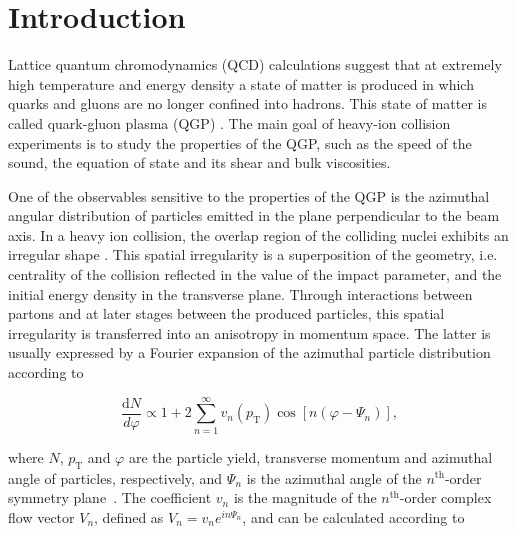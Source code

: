 \section{Introduction}
\label{Sec:Introduction}

Lattice quantum chromodynamics (QCD) calculations \cite{Borsanyi:2010cj,Bhattacharya:2014ara} suggest that at extremely high temperature and energy density a state of matter is produced in which quarks and gluons are no longer confined into hadrons. This state of matter is called quark-gluon plasma (QGP) \cite{Shuryak:1984nq, Cleymans:1985wb, Bass:1998vz}. The main goal of heavy-ion collision experiments is to study the properties of the QGP, such as the speed of the sound, the equation of state and its shear and bulk viscosities.

One of the observables sensitive to the properties of the QGP is the azimuthal angular distribution of particles emitted in the plane perpendicular to the beam axis. In a heavy ion collision, the overlap region of the colliding nuclei exhibits an irregular shape \cite{Bhalerao:2006tp, Alver:2008zza, Alver:2010gr, Alver:2010dn, Manly:2005zy}. This spatial irregularity is a superposition of the geometry, i.e. centrality of the collision reflected in the value of the impact parameter, and the initial energy density in the transverse plane. Through interactions between partons and at later stages between the produced particles, this spatial irregularity is transferred into an anisotropy in momentum space. The latter is usually expressed by a Fourier expansion of the azimuthal particle distribution \cite{Voloshin:1994mz} according to

\begin{equation}
\frac{\mathrm{d}N}{d\varphi} \propto 1+2\sum_{n=1}^{\infty} v_n(p_{\mathrm{T}}) \cos[n(\varphi - \Psi_n)],
\label{Eq:Fourier}
\end{equation}



\noindent where $N$, $p_{\mathrm{T}}$ and $\varphi$ are the particle yield, transverse momentum and azimuthal angle of particles, respectively, and $\Psi_n$ is the azimuthal angle of the $n^{\mathrm{th}}$-order symmetry plane~\cite{Voloshin:2006gz,Bhalerao:2006tp,Alver:2008zza,Alver:2010gr,Alver:2010dn}. The coefficient $v_{n}$ is the magnitude of the $n^{\mathrm{th}}$-order complex flow vector $V_n$, defined as $V_{n} = v_{n}e^{in\Psi_n}$, and can be calculated according to 


